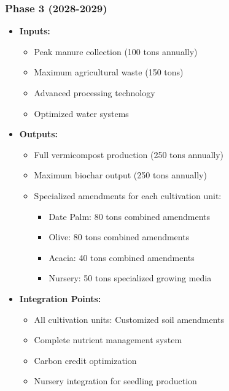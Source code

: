 \subsubsection{Phase 3 (2028-2029)}
\begin{itemize}
    \item \textbf{Inputs:}
    \begin{itemize}
        \item Peak manure collection (100 tons annually)
        \item Maximum agricultural waste (150 tons)
        \item Advanced processing technology
        \item Optimized water systems
    \end{itemize}
    \item \textbf{Outputs:}
    \begin{itemize}
        \item Full vermicompost production (250 tons annually)
        \item Maximum biochar output (250 tons annually)
        \item Specialized amendments for each cultivation unit:
        \begin{itemize}
            \item Date Palm: 80 tons combined amendments
            \item Olive: 80 tons combined amendments
            \item Acacia: 40 tons combined amendments
            \item Nursery: 50 tons specialized growing media
        \end{itemize}
    \end{itemize}
    \item \textbf{Integration Points:}
    \begin{itemize}
        \item All cultivation units: Customized soil amendments
        \item Complete nutrient management system
        \item Carbon credit optimization
        \item Nursery integration for seedling production
    \end{itemize}
\end{itemize}

